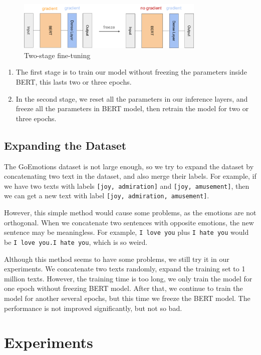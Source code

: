 \documentclass{article}
\begin{document}
\begin{figure}[H]
  \centering
  \includegraphics[width=0.8\textwidth]{img5.png}
  \caption{Two-stage fine-tuning}
\end{figure}


\begin{enumerate}[label=(\alph*)]
  \item The first stage is to train our model without freezing the parameters inside BERT, this lasts two or three epochs.
  \item In the second stage, we reset all the parameters in our inference layers, and freeze all the parameters in BERT model, then retrain the model for two or three epochs.
\end{enumerate}

\subsection{Expanding the Dataset}

The GoEmotions dataset is not large enough, so we try to expand the dataset by concatenating two text in the dataset, and also merge their labels. For example, if we have two texts with labels \texttt{[joy, admiration]} and \texttt{[joy, amusement]}, then we can get a new text with label \texttt{[joy, admiration, amusement]}.

However, this simple method would cause some problems, as the emotions are not orthogonal. When we concatenate two sentences with opposite emotions, the new sentence may be meaningless. For example, \texttt{I love you} plus \texttt{I hate you} would be \texttt{I love you.I hate you}, which is so weird.

Although this method seems to have some problems, we still try it in our experiments. We concatenate two texts randomly, expand the training set to 1 million texts. However, the training time is too long, we only train the model for one epoch without freezing BERT model. After that, we continue to train the model for another several epochs, but this time we freeze the BERT model. The performance is not improved significantly, but not so bad.

\section{Experiments}
\end{document}
